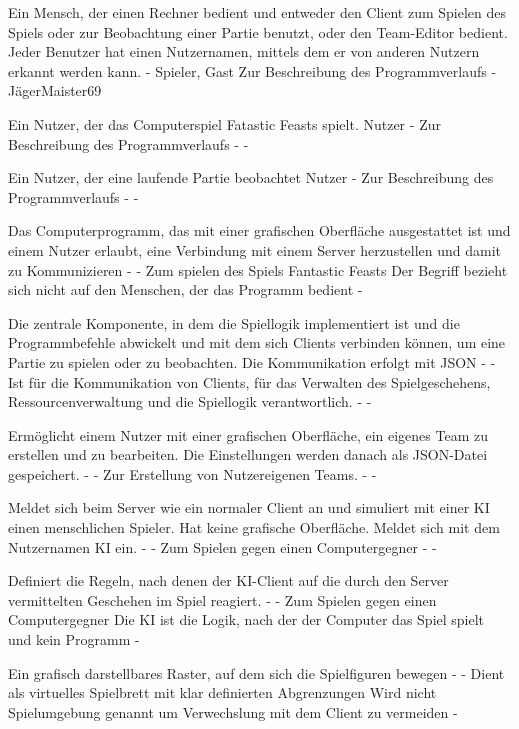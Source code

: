{Ein Mensch, der einen Rechner bedient und entweder den Client zum Spielen des Spiels oder zur Beobachtung einer Partie benutzt, oder den Team-Editor bedient. Jeder Benutzer hat einen Nutzernamen, mittels dem er von anderen Nutzern erkannt werden kann.}
{-}
{Spieler, Gast}
{Zur Beschreibung des Programmverlaufs}
{-}
{JägerMaister69}

{Ein Nutzer, der das Computerspiel \glqq{} Fatastic Feasts\grqq{}  spielt.}
{Nutzer}
{-}
{Zur Beschreibung des Programmverlaufs}
{-}
{-}

{Ein Nutzer, der eine laufende Partie beobachtet}
{Nutzer}
{-}
{Zur Beschreibung des Programmverlaufs}
{-}
{-}

{Das Computerprogramm, das mit einer grafischen Oberfläche ausgestattet ist und einem Nutzer erlaubt, eine Verbindung mit einem Server herzustellen und damit zu Kommunizieren}
{-}
{-}
{Zum spielen des Spiels \glqq{} Fantastic Feasts\grqq{} }
{Der Begriff bezieht sich nicht auf den Menschen, der das Programm bedient}
{-}

{Die zentrale Komponente, in dem die Spiellogik implementiert ist und die Programmbefehle abwickelt und mit dem sich Clients verbinden können, um eine Partie zu spielen oder zu beobachten. Die Kommunikation erfolgt mit JSON}
{-}
{-}
{Ist für die Kommunikation von Clients, für das Verwalten des Spielgeschehens, Ressourcenverwaltung und die Spiellogik verantwortlich.}
{-}
{-}

{Ermöglicht einem Nutzer mit einer grafischen Oberfläche, ein eigenes Team zu erstellen und zu bearbeiten. Die Einstellungen werden danach als JSON-Datei gespeichert.}
{-}
{-}
{Zur Erstellung von Nutzereigenen Teams.}
{-}
{-}

{Meldet sich beim Server wie ein normaler Client an und simuliert mit einer KI einen menschlichen Spieler. Hat keine grafische Oberfläche. Meldet sich mit dem Nutzernamen \glqq{} KI\grqq{}  ein.}
{-}
{-}
{Zum Spielen gegen einen Computergegner}
{-}
{-}

{Definiert die Regeln, nach denen der KI-Client auf die durch den Server vermittelten Geschehen im Spiel reagiert.}
{-}
{-}
{Zum Spielen gegen einen Computergegner}
{Die KI ist die Logik, nach der der Computer das Spiel spielt und kein Programm}
{-}

{Ein grafisch darstellbares Raster, auf dem sich die Spielfiguren bewegen}
{-}
{-}
{Dient als virtuelles Spielbrett mit klar definierten Abgrenzungen}
{Wird nicht Spielumgebung genannt um Verwechslung mit dem Client zu vermeiden}
{-}

